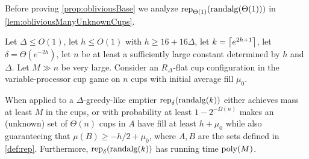 Before proving \cref{prop:obliviousBase} we analyze
$\operatorname{\text{\textup{rep}}}_{\Theta(1)}(\operatorname{\text{\textup{randalg}}}(\Theta(1)))$ in \cref{lem:obliviousManyUnknownCups}.
\begin{lemma}
  \label{lem:obliviousManyUnknownCups}
  Let $\Delta \le O(1)$, let $h \le O(1)$ with $h \ge
  16+16\Delta$, let $k = \left\lceil e^{2h+1} \right\rceil$, let $\delta =
  \Theta(e^{-2h})$, let $n$ be at least a sufficiently large
  constant determined by $h$ and $\Delta$. Let $M\gg n$ be very
  large. Consider an $R_\Delta$-flat cup configuration in the
  variable-processor cup game on $n$ cups with initial average
  fill $\mu_0$.

  When applied to a $\Delta$-greedy-like emptier
  $\operatorname{\text{\textup{rep}}}_{\delta}(\operatorname{\text{\textup{randalg}}}(k))$ either achieves mass at least $M$ in
  the cups, or with probability at least $1-2^{-\Omega(n)}$ makes an
  (unknown) set of $\Theta(n)$ cups in $A$ have fill at least $h + \mu_0$
  while also guaranteeing that $\mu(B) \ge -h/2 + \mu_0$,
  where $A,B$ are the sets defined in \cref{def:rep}.
  Furthermore, $\operatorname{\text{\textup{rep}}}_{\delta}(\operatorname{\text{\textup{randalg}}}(k))$ has running time $\operatorname{\text{poly}}(M)$.
\end{lemma}
